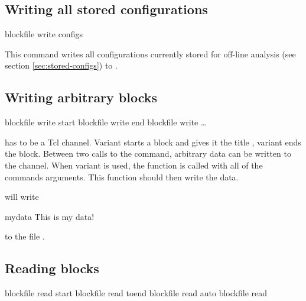 \subsection{Writing all stored configurations}
\label{sec:blockfile:configs}
\begin{essyntax}
  blockfile  write configs
\end{essyntax}

This command writes all configurations currently stored for off-line
analysis (see section \vref{sec:stored-configs}) to .

\subsection{Writing arbitrary blocks}

\begin{essyntax}
   blockfile  write start 
   blockfile  write end
   blockfile  write  \dots
\end{essyntax}

 has to be a Tcl channel. Variant  starts a
block and gives it the title , variant  ends the
block. Between two calls to the command, arbitrary data can be written
to the channel.  When variant  is used, the function
 is called with all of the commands
arguments. This function should then write the data.


will write 
\begin{tclcode}
{mydata {This is my data!}}
\end{tclcode}
to the file .

\subsection{Reading blocks}

\begin{essyntax}
   blockfile  read start 
   blockfile  read toend 
   blockfile  read auto 
   blockfile  read 
\end{essyntax}

